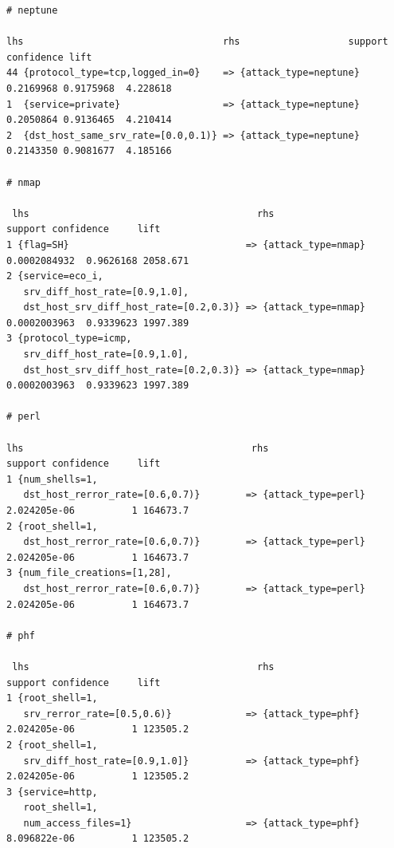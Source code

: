 \documentclass[11pt]{article}
\begin{document}
\begin{Verbatim}[fontsize=\tiny]
# neptune

lhs                                   rhs                   support   confidence lift    
44 {protocol_type=tcp,logged_in=0}    => {attack_type=neptune} 0.2169968 0.9175968  4.228618
1  {service=private}                  => {attack_type=neptune} 0.2050864 0.9136465  4.210414
2  {dst_host_same_srv_rate=[0.0,0.1)} => {attack_type=neptune} 0.2143350 0.9081677  4.185166

# nmap

 lhs                                        rhs                     support confidence     lift
1 {flag=SH}                               => {attack_type=nmap} 0.0002084932  0.9626168 2058.671
2 {service=eco_i,                                                                               
   srv_diff_host_rate=[0.9,1.0],                                                                
   dst_host_srv_diff_host_rate=[0.2,0.3)} => {attack_type=nmap} 0.0002003963  0.9339623 1997.389
3 {protocol_type=icmp,                                                                          
   srv_diff_host_rate=[0.9,1.0],                                                                
   dst_host_srv_diff_host_rate=[0.2,0.3)} => {attack_type=nmap} 0.0002003963  0.9339623 1997.389
   
# perl

lhs                                        rhs                     support confidence     lift
1 {num_shells=1,                                                                                
   dst_host_rerror_rate=[0.6,0.7)}        => {attack_type=perl} 2.024205e-06          1 164673.7
2 {root_shell=1,                                                                                
   dst_host_rerror_rate=[0.6,0.7)}        => {attack_type=perl} 2.024205e-06          1 164673.7
3 {num_file_creations=[1,28],                                                                   
   dst_host_rerror_rate=[0.6,0.7)}        => {attack_type=perl} 2.024205e-06          1 164673.7
   
# phf
 
 lhs                                        rhs                    support confidence     lift
1 {root_shell=1,                                                                               
   srv_rerror_rate=[0.5,0.6)}             => {attack_type=phf} 2.024205e-06          1 123505.2
2 {root_shell=1,                                                                               
   srv_diff_host_rate=[0.9,1.0]}          => {attack_type=phf} 2.024205e-06          1 123505.2
3 {service=http,                                                                               
   root_shell=1,                                                                               
   num_access_files=1}                    => {attack_type=phf} 8.096822e-06          1 123505.2
   

\end{Verbatim}
\end{document}

